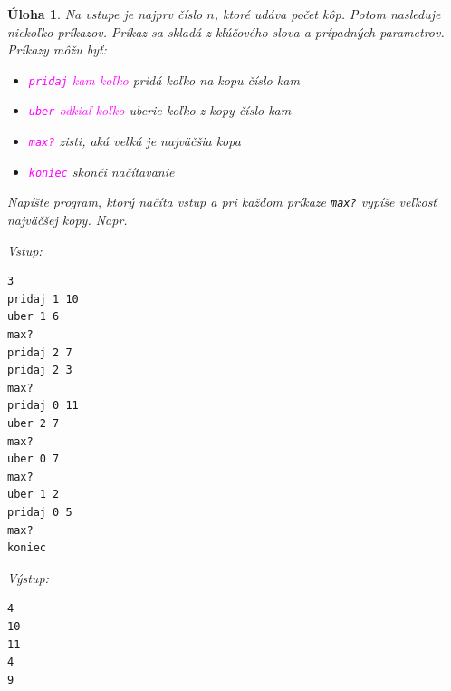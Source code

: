 \documentclass[10pt]{article}
\def\ods{\vspace*{10pt}}
\newtheorem{uloha}{Úloha}
\def\bp{\begin{minipage}[t]{0.45\textwidth}\vspace{0pt}}
\def\ep{\end{minipage}}
\def\inp{{\rm Vstup:}\\[-4.2ex]}
\def\outp{{\rm Výstup:}\\[-4.2ex]}
\begin{document}
\begin{uloha}
  Na vstupe je najprv číslo $n$, ktoré udáva počet kôp. Potom nasleduje
  niekoľko príkazov. Príkaz sa skladá z kľúčového slova a prípadných parametrov.
  Príkazy môžu byť:
\begin{itemize}\itemsep=-1mm
    \item \textcolor{magenta}{{\tt pridaj} {\em kam koľko}} 
      pridá {\em koľko} na kopu číslo {\em kam}
    \item \textcolor{magenta}{{\tt uber} {\em odkiaľ koľko}}
      uberie {\em koľko} z kopy číslo {\em kam}
    \item \textcolor{magenta}{\tt max?}
      zisti, aká veľká je najväčšia kopa
    \item \textcolor{magenta}{\tt koniec}
      skonči načítavanie
\end{itemize}
  Napíšte program, ktorý načíta vstup a pri každom príkaze {\tt max?}
  vypíše veľkosť najväčšej kopy. Napr. 

\ods
\bp
\inp
\begin{verbatim}
3
pridaj 1 10
uber 1 6
max?
pridaj 2 7
pridaj 2 3
max?
pridaj 0 11
uber 2 7
max?
uber 0 7
max?
uber 1 2
pridaj 0 5
max?
koniec
\end{verbatim}
\ep
\hfill
\bp
\outp
\begin{verbatim}
4
10
11
4
9
\end{verbatim}
\ep
\end{uloha}
\end{document}
